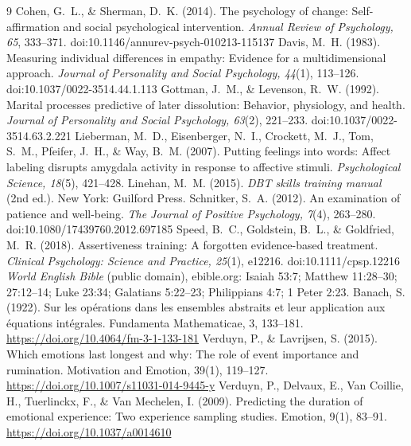 \documentclass[10pt]{article}
\theoremstyle{remark}
\begin{document}
\begin{thebibliography}{9}\setlength{\itemsep}{1pt}
 Cohen, G.~L., \& Sherman, D.~K. (2014). The psychology of change: Self-affirmation and social psychological intervention. \emph{Annual Review of Psychology, 65}, 333--371. doi:10.1146/annurev-psych-010213-115137
 Davis, M.~H. (1983). Measuring individual differences in empathy: Evidence for a multidimensional approach. \emph{Journal of Personality and Social Psychology, 44}(1), 113--126. doi:10.1037/0022-3514.44.1.113
 Gottman, J.~M., \& Levenson, R.~W. (1992). Marital processes predictive of later dissolution: Behavior, physiology, and health. \emph{Journal of Personality and Social Psychology, 63}(2), 221--233. doi:10.1037/0022-3514.63.2.221
 Lieberman, M.~D., Eisenberger, N.~I., Crockett, M.~J., Tom, S.~M., Pfeifer, J.~H., \& Way, B.~M. (2007). Putting feelings into words: Affect labeling disrupts amygdala activity in response to affective stimuli. \emph{Psychological Science, 18}(5), 421--428.
 Linehan, M.~M. (2015). \emph{DBT skills training manual} (2nd ed.). New York: Guilford Press.
 Schnitker, S.~A. (2012). An examination of patience and well-being. \emph{The Journal of Positive Psychology, 7}(4), 263--280. doi:10.1080/17439760.2012.697185
 Speed, B.~C., Goldstein, B.~L., \& Goldfried, M.~R. (2018). Assertiveness training: A forgotten evidence-based treatment. \emph{Clinical Psychology: Science and Practice, 25}(1), e12216. doi:10.1111/cpsp.12216
 \emph{World English Bible} (public domain), ebible.org: Isaiah 53:7; Matthew 11:28--30; 27:12--14; Luke 23:34; Galatians 5:22--23; Philippians 4:7; 1 Peter 2:23.
 Banach, S. (1922). Sur les op\'erations dans les ensembles abstraits et leur application aux \'equations int\'egrales. Fundamenta Mathematicae, 3, 133--181. \url{https://doi.org/10.4064/fm-3-1-133-181}
 Verduyn, P., \& Lavrijsen, S. (2015). Which emotions last longest and why: The role of event importance and rumination. Motivation and Emotion, 39(1), 119--127. \url{https://doi.org/10.1007/s11031-014-9445-y}
 Verduyn, P., Delvaux, E., Van Coillie, H., Tuerlinckx, F., \& Van Mechelen, I. (2009). Predicting the duration of emotional experience: Two experience sampling studies. Emotion, 9(1), 83--91. \url{https://doi.org/10.1037/a0014610}

\end{thebibliography}
\end{document}
